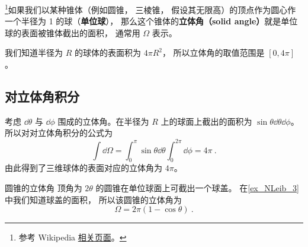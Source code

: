 
\begin{issues}
\issueTODO
\end{issues}


\footnote{参考 Wikipedia \href{https://en.wikipedia.org/wiki/Solid_angle}{相关页面}。}如果我们以某种锥体（例如圆锥， 三棱锥， 假设其无限高）的顶点作为圆心作一个半径为 1 的球（\textbf{单位球}）， 那么这个锥体的\textbf{立体角（solid angle）}就是单位球的表面被锥体截出的面积， 通常用 $\Omega$ 表示。

我们知道半径为 $R$ 的球体的表面积为 $4\pi R^2$， 所以立体角的取值范围是 $[0, 4\pi]$。

\subsection{对立体角积分}
考虑 $\dd \theta$ 与 $\dd \phi$ 围成的立体角。在半径为 $R$ 上的球面上截出的面积为 $\sin\theta \dd \theta \dd \phi$。所以对对立体角积分的公式为
\begin{equation}
\int \dd \Omega=\int_0^\pi \sin\theta \dd \theta \int_0^{2\pi }\dd \phi =4\pi~.
\end{equation}
由此得到了三维球体的表面对应的立体角为 $4\pi$。


\begin{example}{圆锥的立体角}
顶角为 $2\theta$ 的圆锥在单位球面上可截出一个球盖。 在\autoref{ex_NLeib_3}~ 中我们知道球盖的面积， 所以该圆锥的立体角为
\begin{equation}
\Omega = 2\pi (1 - \cos\theta)~.
\end{equation}
\end{example}


